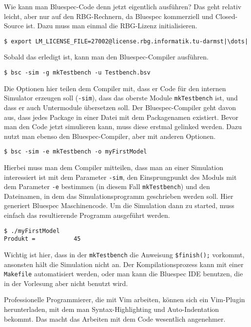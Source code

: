 \documentclass[ngerman]{scrartcl}
\begin{document}
Wie kann man Bluespec-Code denn jetzt eigentlich ausführen? Das geht relativ leicht, aber nur auf den RBG-Rechnern, da Bluespec kommerziell und Closed-Source ist. Dazu muss man einmal die RBG-Lizenz initialisieren.
\begin{lstlisting}
$ export LM_LICENSE_FILE=27002@license.rbg.informatik.tu-darmst|\dots|
\end{lstlisting}
Sobald das erledigt ist, kann man den Bluespec-Compiler ausführen. 
\begin{lstlisting}
$ bsc -sim -g mkTestbench -u Testbench.bsv  
\end{lstlisting}
Die Optionen hier teilen dem Compiler mit, dass er Code für den internen Simulator erzeugen soll (\verb|-sim|), dass das oberste Module \verb|mkTestbench| ist, und dass er auch Untermodule übersetzen soll. Der Bluespec-Compiler geht davon aus, dass jedes Package in einer Datei mit dem Packagenamen existiert.
Bevor man den Code jetzt simulieren kann, muss diese erstmal gelinked werden. Dazu nutzt man ebenso den Bluespec-Compiler, aber mit anderen Optionen.
\begin{lstlisting}
$ bsc -sim -e mkTestbench -o myFirstModel  
\end{lstlisting}
Hierbei muss man dem Compiler mitteilen, dass man an einer Simulation interessiert ist mit dem Parameter \verb|-sim|, den Einsprungpunkt des Moduls mit dem Parameter \verb|-e| bestimmen (in diesem Fall \verb|mkTestbench|) und den Dateinamen, in dem das Simulationsprogramm geschrieben werden soll. Hier generiert Bluespec Maschinencode. Um die Simulation dann zu started, muss einfach das resultierende Programm ausgeführt werden. 
\begin{lstlisting}
$ ./myFirstModel
Produkt =           45  
\end{lstlisting}
Wichtig ist hier, dass in der \verb|mkTestbench| die Anweisung \verb|$finish();| vorkommt, ansonsten hält die Simulation nicht an. Der Kompilationsprozess kann mit einer \verb|Makefile| automatisiert werden, oder man kann die Bluespec IDE benutzen, die in der Vorlesung aber nicht benutzt wird.

\begin{anmerkung}
Professionelle Programmierer, die mit Vim arbeiten, können sich ein Vim-Plugin herunterladen, mit dem man Syntax-Highlighting und Auto-Indentation bekommt. Das macht das Arbeiten mit dem Code wesentlich angenehmer\footnotemark.
\end{anmerkung}

\end{document}
